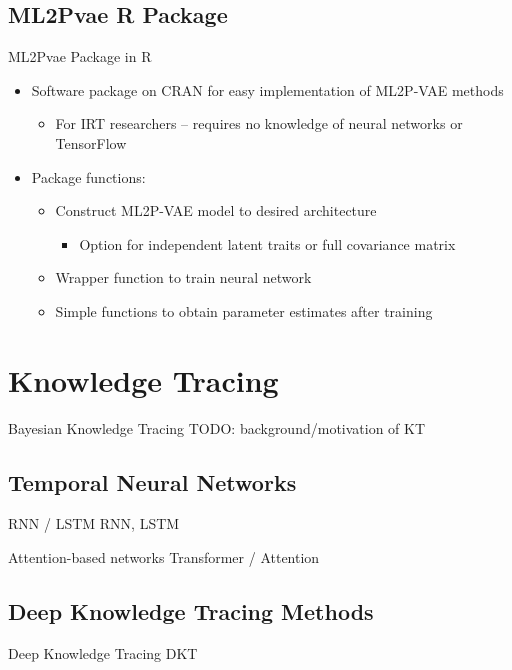 \documentclass{beamer}
\theoremstyle{definition}
\begin{document}
\subsection{ML2Pvae R Package}
\begin{frame}{ML2Pvae Package in R}
\begin{itemize}
  \item Software package on CRAN for easy implementation of ML2P-VAE methods
    \begin{itemize}
      \item For IRT researchers -- requires no knowledge of neural networks or TensorFlow
    \end{itemize}
  \item<2-> Package functions:
  \begin{itemize}
    \item<2-> Construct ML2P-VAE model to desired architecture
      \begin{itemize}
        \item<2-> Option for independent latent traits or full covariance matrix
      \end{itemize}
    \item<2-> Wrapper function to train neural network
    \item<2-> Simple functions to obtain parameter estimates after training
  \end{itemize}
\end{itemize}
\end{frame}


\section{Knowledge Tracing}

\begin{frame}{Bayesian Knowledge Tracing}
  TODO: background/motivation of KT
\end{frame}

\subsection{Temporal Neural Networks}
\begin{frame}{RNN / LSTM}
  RNN, LSTM 
\end{frame}

\begin{frame}{Attention-based networks}
  Transformer / Attention
\end{frame}

\subsection{Deep Knowledge Tracing Methods}
\begin{frame}{Deep Knowledge Tracing}
  DKT
\end{frame}
\end{document}
